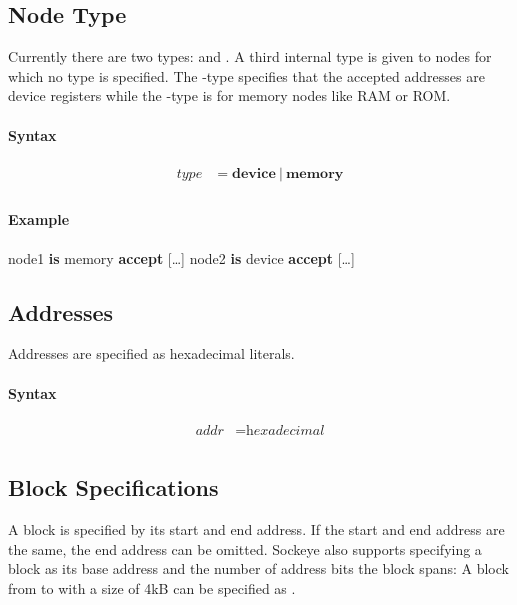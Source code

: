 \documentclass[a4paper,11pt,twoside]{report}
\begin{document}
{{{\subsection{Node Type}
Currently there are two types:  and . A third internal type  is given to nodes for which no type is specified.
The -type specifies that the accepted addresses are device registers while the -type is for memory nodes like RAM or ROM.

\paragraph{Syntax}
\begin{align*}
\textit{type} & \mathop{=}
    \textbf{device}\
    |\
    \textbf{memory} \\
\end{align*}

\paragraph{Example}
\begin{syntax}
    node1 \textbf{is} memory \textbf{accept} [\ldots]
    node2 \textbf{is} device \textbf{accept} [\ldots]
\end{syntax}

\subsection{Addresses}
Addresses are specified as hexadecimal literals.

\paragraph{Syntax}
\begin{align*}
\textit{addr} & \mathop{=} \textit{hexadecimal} \\
\end{align*}

\subsection{Block Specifications}
A block is specified by its start and end address.
If the start and end address are the same, the end address can be omitted.
Sockeye also supports specifying a block as its base address and the number of address bits the block spans:
A block from \Sockeye{0x0} to \Sockeye{0xFFF} with a size of 4kB can be specified as .

}}}
\end{document}
